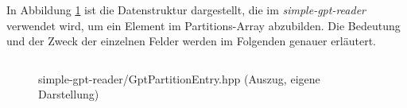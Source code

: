 In Abbildung \ref{fig:GptPartitionEntry.hpp} ist die Datenstruktur dargestellt, die im \textit{simple-gpt-reader} verwendet wird, um ein Element im Partitions-Array abzubilden.
Die Bedeutung und der Zweck der einzelnen Felder werden im Folgenden genauer erläutert.

\begin{figure}[ht]
    \inputminted[baselinestretch=1.2, linenos, tabsize=4, breaklines, frame=single]{c++}{content/code/simple-gpt-reader/GptPartitionEntry.hpp}
    
    \vspace{-0.5cm}

    \caption{simple-gpt-reader/GptPartitionEntry.hpp (Auszug, eigene Darstellung)}
    \label{fig:GptPartitionEntry.hpp}
\end{figure}

